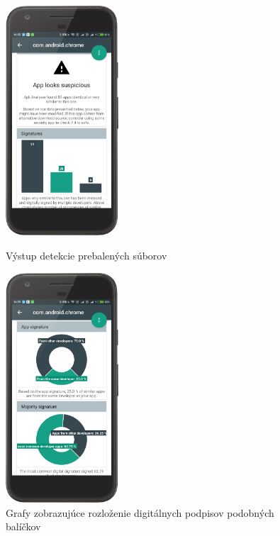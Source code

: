 \begin{figure}[H]
\begin{minipage}[t][][b]{0.45\textwidth}
\centering
    \includegraphics[width=4.2cm]{images/app/detection_device_1.png}
\centering
\caption{Výstup detekcie prebalených súborov}
\label{fig:detection-1}
\end{minipage}%
\hfill
\centering
\begin{minipage}[t][][b]{0.45\textwidth}
\centering
    \includegraphics[width=4.2cm]{images/app/detection_device_2.png}
\centering
\caption{Grafy zobrazujúce rozloženie digitálnych podpisov podobných balíčkov}
\label{fig:detection-2}
\end{minipage}%
\end{figure}

	
	
